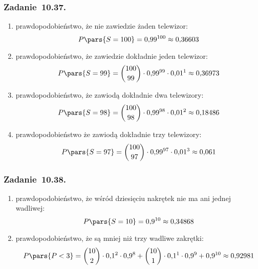 \subsubsection*{Zadanie~10.37.}
\begin{enumerate}[label={\alph*)}]
    \item prawdopodobieństwo, że nie zawiedzie żaden telewizor:
        \begin{equation*}
            P\pars{S = 100} = 0{,}99^{100} \approx 0{,}36603
        \end{equation*}
    \item prawdopodobieństwo, że zawiedzie dokładnie jeden telewizor:
        \begin{equation*}
            P\pars{S = 99} = \binom{100}{99} \cdot 0{,}99^{99} \cdot 0{,}01^1 \approx 0{,}36973
        \end{equation*}
    \item prawdopodobieństwo, że zawiodą dokładnie dwa telewizory:
        \begin{equation*}
            P\pars{S = 98} = \binom{100}{98} \cdot 0{,}99^{98} \cdot 0{,}01^2 \approx 0{,}18486
        \end{equation*}
    \item prawdopodobieństwo że zawiodą dokładnie trzy telewizory:
        \begin{equation*}
            P\pars{S = 97} = \binom{100}{97} \cdot 0{,}99^{97} \cdot 0{,}01^3 \approx 0{,}061
        \end{equation*}
\end{enumerate}
\subsubsection*{Zadanie~10.38.}
\begin{enumerate}[label={\alph*)}]
    \item prawdopodobieństwo, że wśród dziesięciu nakrętek nie ma ani jednej wadliwej:
        \begin{equation*}
            P\pars{S = 10} = 0{,}9^{10} \approx 0{,}34868
        \end{equation*}
    \item prawdopodobieństwo, że są mniej niż trzy wadliwe zakrętki:
        \begin{equation*}
            P\pars{P < 3} = \binom{10}{2} \cdot 0{,}1^2 \cdot 0{,}9^8 + \binom{10}{1} \cdot 0{,}1^1 \cdot 0{,}9^9 + 0{,}9^{10} \approx 0{,}92981
        \end{equation*}
\end{enumerate}
